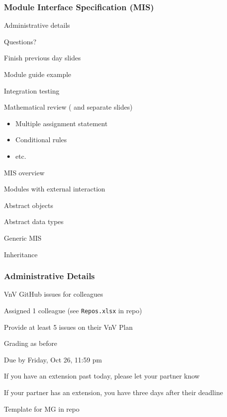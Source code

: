 \documentclass[t, 12pt, numbers, fleqn, handout]{beamer}
\begin{document}



\begin{frame}
\frametitle{Module Interface Specification (MIS)}

\bi
\item Administrative details
\item Questions?
\item Finish previous day slides
\item Module guide example
\item Integration testing
\item Mathematical review (\cite{HoffmanAndStrooper1995} and separate slides)
\begin{itemize}
\item Multiple assignment statement
\item Conditional rules
\item etc.
\end{itemize}
\item MIS overview
\item Modules with external interaction
\item Abstract objects
\item Abstract data types
\item Generic MIS
\item Inheritance
\ei
\end{frame}


\begin{frame}
\frametitle{Administrative Details}

\bi
\item VnV GitHub issues for colleagues
\bi
\item Assigned 1 colleague (see \texttt{Repos.xlsx} in repo)
\item Provide at least 5 issues on their VnV Plan
\item Grading as before
\item Due by Friday, Oct 26, 11:59 pm
\item If you have an extension past today, please let your partner know
\item If your partner has an extension, you have three days after their deadline
 \ei
  
\item Template for MG in repo

\ei

\end{frame}
\end{document}
